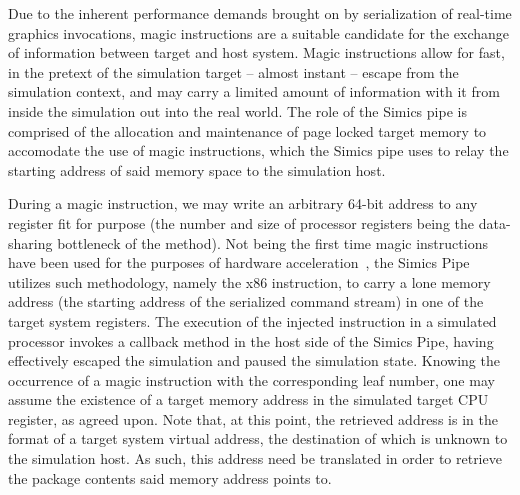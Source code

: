 Due to the inherent performance demands brought on by serialization of real-time graphics invocations, magic instructions are a suitable candidate for the exchange of information between target and host system.
Magic instructions allow for fast, in the pretext of the simulation target -- almost instant -- escape from the simulation context, and may carry a limited amount of information with it from inside the simulation out into the real world.
The role of the Simics pipe is comprised of the allocation and maintenance of page locked target memory to accomodate the use of magic instructions, which the Simics pipe uses to relay the starting address of said memory space to the simulation host.

During a magic instruction, we may write an arbitrary 64-bit address to any register fit for purpose (the number and size of processor registers being the data-sharing bottleneck of the method).
Not being the first time magic instructions have been used for the purposes of hardware acceleration~, the Simics Pipe utilizes such methodology, namely the  x86 instruction, to carry a lone memory address (the starting address of the serialized command stream) in one of the target system registers.
The execution of the injected instruction in a simulated processor invokes a callback method in the host side of the Simics Pipe, having effectively escaped the simulation and paused the simulation state.
Knowing the occurrence of a magic instruction with the corresponding leaf number, one may assume the existence of a target memory address in the simulated target CPU register, as agreed upon.
Note that, at this point, the retrieved address is in the format of a target system virtual address, the destination of which is unknown to the simulation host.
As such, this address need be translated in order to retrieve the package contents said memory address points to.

